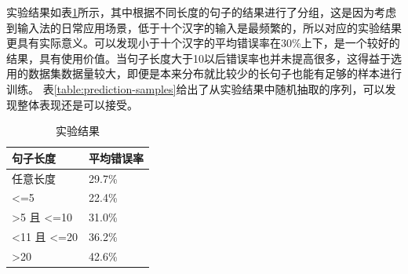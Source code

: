 \documentclass[12pt,a4paper]{ctexart}
\begin{document}
\bigskip

实验结果如表\ref{table:experiment-result}所示，其中根据不同长度的句子的结果进行了分组，这是因为考虑到输入法的日常应用场景，低于十个汉字的输入是最频繁的，所以对应的实验结果更具有实际意义。可以发现小于十个汉字的平均错误率在30\%上下，是一个较好的结果，具有使用价值。当句子长度大于10以后错误率也并未提高很多，这得益于选用的数据集数据量较大，即便是本来分布就比较少的长句子也能有足够的样本进行训练。
表\ref{table:prediction-samples}给出了从实验结果中随机抽取的序列，可以发现整体表现还是可以接受。
\bigskip
\bigskip

\begin{table}[H]
	\centering
	\begin{tabular}{@{}ll@{}}
		\toprule
		句子长度 & 平均错误率 \\ \midrule
		任意长度 & 29.7\% \\
		\textless{}=5 & 22.4\% \\
		\textgreater{}5 且 \textless{}=10 & 31.0\% \\
		\textless{}11 且 \textless{}=20 & 36.2\% \\
		\textgreater{}20 & 42.6\% \\ \bottomrule
	\end{tabular}
	\caption{实验结果}
	\label{table:experiment-result}
\end{table}
\end{document}
